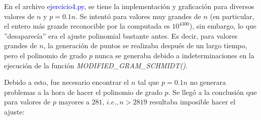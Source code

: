 En el archivo \textcolor{mediumblue}{ejercicio4.py}, se tiene la implementación y graficación para diversos valores de $n$ y $p=0.1n$. Se intentó para valores muy grandes de $n$ (en particular, el entero más grande reconocible por la computada es $10^{4300}$), sin embargo, lo que ''desaparecía'' era el ajuste polinomial bastante antes. Es decir, para valores grandes de $n$, la generación de puntos se realizaba después de un largo tiempo, pero el polinomio de grado $p$ nunca se generaba debido a indeterminaciones en la ejecución de la función \textit{MODIFIED\_GRAM\_SCHMIDT()}.

Debido a esto, fue necesario encontrar el $n$ tal que $p=0.1n$ no generara problemas a la hora de hacer el polinomio de grado $p$. Se llegó a la conclusión que para valores de $p$ mayores a $281$, $i.e., n>2819$ resultaba imposible hacer el ajuste:

